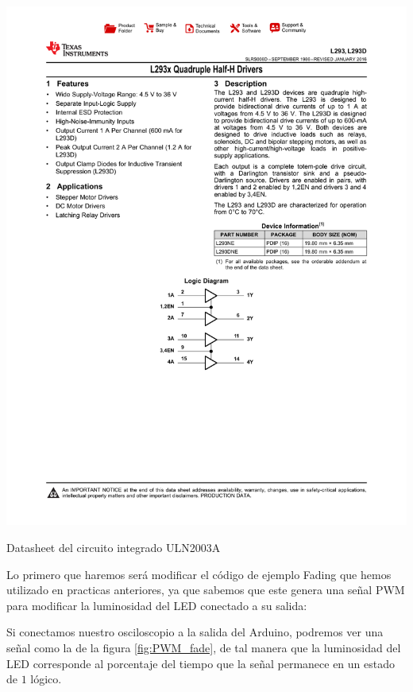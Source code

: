 		\begin{marginfigure}
			\begin{center}
				\includegraphics[width=\textwidth]{images/por_data.pdf}
				\caption{Datasheet del circuito integrado ULN2003A}
				\label{fig:data}
			\end{center}
		\end{marginfigure}

		Lo primero que haremos será modificar el código de ejemplo Fading que hemos utilizado en practicas anteriores, ya que sabemos que este genera una señal PWM para modificar la luminosidad del LED conectado a su salida:

		

		Si conectamos nuestro osciloscopio a la salida del Arduino, podremos ver una señal como la de la figura \ref{fig:PWM_fade}, de tal manera que la luminosidad del LED corresponde al porcentaje del tiempo que la señal permanece en un estado de $1$ lógico.

